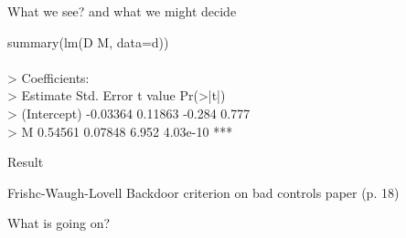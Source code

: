 %
%
\begin{lhframe}[rhgraphic={\texttt{[image: spurious.pdf]}}]
	{What we see?}
	{and what we might decide}
	
	
	\begin{codesnippet}[\textwidth]
		summary(lm(D \command{~} M, data=d)) \\ \\
		> Coefficients: \\
		> Estimate Std. Error t value Pr(>|t|) \\
		> (Intercept) -0.03364    0.11863  -0.284    0.777 \\
		> M            0.54561    0.07848   6.952 4.03e-10 *** \\ 
	\end{codesnippet}
\end{lhframe}
%
%
\begin{frame}[t]
	{Result}
	
	Frishc-Waugh-Lovell
	Backdoor criterion on bad controls paper (p. 18)
\end{frame}
%
%
\begin{frame}[t]
	{What is going on?}
\end{frame}
%
%
